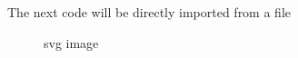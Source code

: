 \documentclass{article}
\begin{document}
    The next code will be directly imported from a file


\begin{figure}[htbp]
    \centering
    
    \caption{svg image}
\end{figure}
\end{document}
